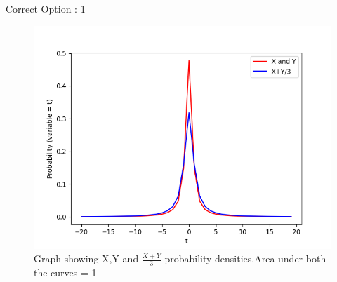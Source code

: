\documentclass[journal,12pt,twocolumn]{IEEEtran}
\begin{document}
\begin{center}
    Correct Option : 1
\end{center}
\begin{figure}[H]
    \includegraphics[width = \columnwidth]{Assignment-8.png}
    \caption{Graph showing X,Y and $\frac{X+Y}{3}$ probability densities.Area under both the curves = 1}
\end{figure}
\end{document}
